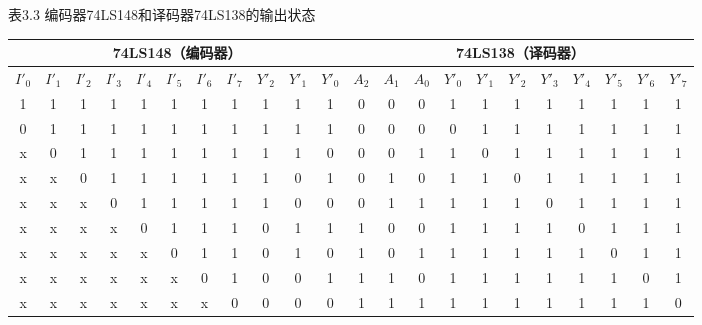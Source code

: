 \documentclass{ctexart}
\begin{document}
\begin{table}[!ht]
\centering 表3.3 编码器74LS148和译码器74LS138的输出状态

\begin{tabular}{|cccccccc|ccc|ccc|cccccccc|}
\hline
\multicolumn{11}{|c|}{74LS148（编码器）} & \multicolumn{11}{c|}{74LS138（译码器）}       \\ \hline
$I'_0$ & $I'_1$ & $I'_2$ & $I'_3$ & $I'_4$ & $I'_5$ & $I'_6$ & $I'_7$ & $Y'_2$ & $Y'_1$ & $Y'_0$ & $A_2$ & $A_1$ & $A_0$ & $Y'_0$ & $Y'_1$ & $Y'_2$ & $Y'_3$ & $Y'_4$ & $Y'_5$ & $Y'_6$ & $Y'_7$ \\ \hline
1      & 1      & 1      & 1      & 1      & 1      & 1      & 1      & 1      & 1      & 1      & 0     & 0     & 0     & 1      & 1      & 1      & 1      & 1      & 1      & 1      & 1      \\ \hline
0      & 1      & 1      & 1      & 1      & 1      & 1      & 1      & 1      & 1      & 1      & 0     & 0     & 0     & 0      & 1      & 1      & 1      & 1      & 1      & 1      & 1      \\ \hline
x      & 0      & 1      & 1      & 1      & 1      & 1      & 1      & 1      & 1      & 0      & 0     & 0     & 1     & 1      & 0      & 1      & 1      & 1      & 1      & 1      & 1      \\ \hline
x      & x      & 0      & 1      & 1      & 1      & 1      & 1      & 1      & 0      & 1      & 0     & 1     & 0     & 1      & 1      & 0      & 1      & 1      & 1      & 1      & 1      \\ \hline
x      & x      & x      & 0      & 1      & 1      & 1      & 1      & 1      & 0      & 0      & 0     & 1     & 1     & 1      & 1      & 1      & 0      & 1      & 1      & 1      & 1      \\ \hline
x      & x      & x      & x      & 0      & 1      & 1      & 1      & 0      & 1      & 1      & 1     & 0     & 0     & 1      & 1      & 1      & 1      & 0      & 1      & 1      & 1      \\ \hline
x      & x      & x      & x      & x      & 0      & 1      & 1      & 0      & 1      & 0      & 1     & 0     & 1     & 1      & 1      & 1      & 1      & 1      & 0      & 1      & 1      \\ \hline
x      & x      & x      & x      & x      & x      & 0      & 1      & 0      & 0      & 1      & 1     & 1     & 0     & 1      & 1      & 1      & 1      & 1      & 1      & 0      & 1      \\ \hline
x      & x      & x      & x      & x      & x      & x      & 0      & 0      & 0      & 0      & 1     & 1     & 1     & 1      & 1      & 1      & 1      & 1      & 1      & 1      & 0      \\ \hline
\end{tabular}
\end{table}
\end{document}
